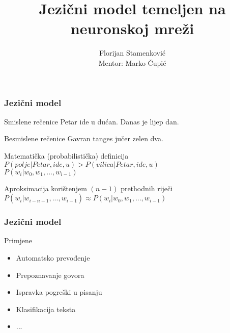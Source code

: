 \documentclass[utf8]{beamer}
\begin{document}
\title{Jezični model temeljen na neuronskoj mreži}
\author{Florijan Stamenković \\
	Mentor: Marko Čupić}

\frame{\titlepage}

\begin{frame}
\frametitle{Jezični model}

	\pause

	\begin{block}{Smislene rečenice}
	Petar ide u dućan. Danas je lijep dan.
	\end{block}

	\pause

	\begin{block}{Besmislene rečenice}
	Gavran tanges jučer zelen dva.
	\end{block}

	\pause

	\begin{block}{Matematička (probabilistička) definicija}
	$P(polje | Petar, ide, u) > P(vilica | Petar, ide, u)$ \\
	$P(w_i | w_0, w_1, ..., w_{i - 1})$
	\end{block}

	\pause

	\begin{block}{Aproksimacija korištenjem $(n - 1)$ prethodnih riječi}
	$P(w_i | w_{i - n + 1}, ... , w_{i - 1}) \approx P(w_i | w_0, w_1, ..., w_{i - 1})$
	\end{block}

\end{frame}

\begin{frame}
\frametitle{Jezični model}

	\begin{block}{Primjene}
	\begin{itemize}[<+->]
		\item{Automatsko prevođenje}
		\item{Prepoznavanje govora}
		\item{Ispravka pogreški u pisanju}
		\item{Klasifikacija teksta}
		\item{...}
	\end{itemize}
	\end{block}

\end{frame}
\end{document}
